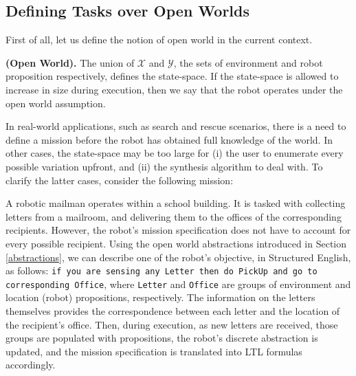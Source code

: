 \subsection{Defining Tasks over Open Worlds}

First of all, let us define the notion of open world in the current context.

\begin{myDefinition}
	\textbf{(Open World).} The union of $\mathcal{X}$ and $\mathcal{Y}$, the sets of environment and robot proposition respectively, defines the state-space. If the state-space is allowed to increase in size during execution, then we say that the robot operates under the open world assumption.
\end{myDefinition}

In real-world applications, such as search and rescue scenarios, there is a need to define a mission before the robot has obtained full knowledge of the world. In other cases, the state-space may be too large for (i) the user to enumerate every possible variation upfront, and (ii) the synthesis algorithm to deal with. To clarify the latter cases, consider the following mission:

\begin{myExample}\label{Ex:mission1}
	A robotic mailman operates within a school building. It is tasked with collecting letters from a mailroom, and delivering them to the offices of the corresponding recipients. However, the robot's mission specification does not have to account for every possible recipient. Using the open world abstractions introduced in Section \ref{abstractions}, we can describe one of the robot's objective, in Structured English, as follows: 
\texttt{if you are sensing any Letter then do PickUp and go to corresponding Office}, where \texttt{Letter} and \texttt{Office} are groups of environment and location (robot) propositions, respectively.
The information on the letters themselves provides the correspondence between each letter and the location of the recipient's office. Then, during execution, as new letters are received, those groups are populated with propositions, the robot's discrete abstraction is updated, and the mission specification is translated into LTL formulas accordingly.
\end{myExample}


